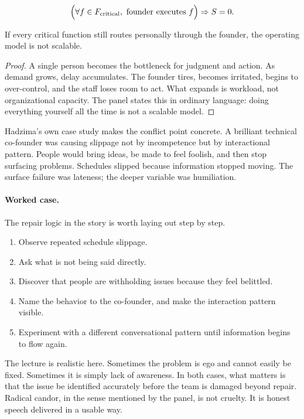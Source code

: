 \begin{equation}
\Bigl(\forall f\in F_{\mathrm{critical}},\ \text{founder executes }f\Bigr)\Rightarrow S=0.
\end{equation}

\begin{proposition}
If every critical function still routes personally through the founder, the operating model is not scalable.
\end{proposition}

\begin{proof}
A single person becomes the bottleneck for judgment and action. As demand grows, delay accumulates. The founder tires, becomes irritated, begins to over-control, and the staff loses room to act. What expands is workload, not organizational capacity. The panel states this in ordinary language: doing everything yourself all the time is not a scalable model.
\end{proof}

Hadzima's own case study makes the conflict point concrete. A brilliant technical co-founder was causing slippage not by incompetence but by interactional pattern. People would bring ideas, be made to feel foolish, and then stop surfacing problems. Schedules slipped because information stopped moving. The surface failure was lateness; the deeper variable was humiliation.

\paragraph{Worked case.} The repair logic in the story is worth laying out step by step.

\begin{enumerate}
\item Observe repeated schedule slippage.
\item Ask what is not being said directly.
\item Discover that people are withholding issues because they feel belittled.
\item Name the behavior to the co-founder, and make the interaction pattern visible.
\item Experiment with a different conversational pattern until information begins to flow again.
\end{enumerate}

The lecture is realistic here. Sometimes the problem is ego and cannot easily be fixed. Sometimes it is simply lack of awareness. In both cases, what matters is that the issue be identified accurately before the team is damaged beyond repair. Radical candor, in the sense mentioned by the panel, is not cruelty. It is honest speech delivered in a usable way.

